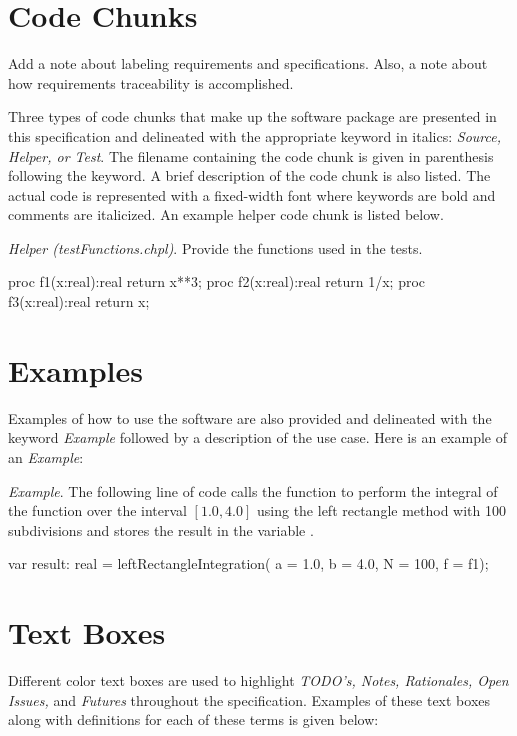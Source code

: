 \label{Notation}

\section{Code Chunks}
\begin{TODO}
  Add a note about labeling requirements and specifications. Also, a note about how
  requirements traceability is accomplished.
\end{TODO}

Three types of code chunks that make up the software package are 
presented in this specification and delineated
with the appropriate keyword in italics: 
\textit{Source, Helper, or Test}.  The filename containing the code
chunk is given in parenthesis following the keyword. A brief description 
of the code chunk is also listed.
The actual code is represented with a fixed-width font where keywords are
bold and comments are italicized. An example helper code chunk is listed
below.

\textit{Helper (testFunctions.chpl)}. Provide the functions used
in the tests.
\begin{chapel}
proc f1(x:real):real {
  return x**3;
} 
proc f2(x:real):real {
  return 1/x;
} 
proc f3(x:real):real {
  return x;
} 
\end{chapel}

\section{Examples}

Examples of how to use the software are also provided and delineated with the
keyword \textit{Example} followed by a description of the use case. Here is
an example of an \textit{Example}:

\textit{Example}. The following line of code calls the function
 to perform the integral of the function 
over the interval $[1.0,4.0]$ using the left rectangle method with 100 subdivisions
and stores the result in the variable .
\begin{chapel}
var result: real = leftRectangleIntegration(
  a = 1.0, b = 4.0, N = 100, f = f1);
\end{chapel}

\section{Text Boxes}
Different color text boxes are used to highlight \textit{TODO's, Notes,
Rationales, Open Issues,} and \textit{Futures} throughout the specification.
Examples of these text boxes along with definitions for each of these terms
is given below:

